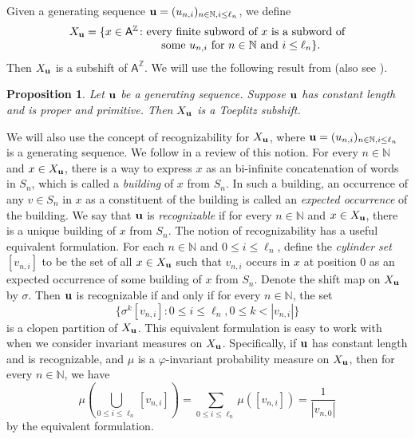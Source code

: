 \documentclass{amsart}
\newtheorem{proposition}[theorem]{Proposition}
\theoremstyle{definition}
\theoremstyle{problem}
\theoremstyle{remark}
\numberwithin{equation}{section}
\begin{document}
Given a generating sequence ${\bf u}=(u_{n,i})_{n\in\mathbb{N}, i\leq \ell_n}$, we define 
$$\begin{array}{rl} X_{\bf u}=\{x\in \mathsf{A}^\mathbb{Z}\colon &\!\!\!\!\!\!\!\! \mbox{ every finite subword of $x$ is a subword of} \\
& \mbox{ some $u_{n,i}$ for $n\in\mathbb{N}$ and $i\leq \ell_n$}\}. 
\end{array}
$$ 
Then $X_{\bf u}$ is a subshift of $\mathsf{A}^\mathbb{Z}$. We will use the following result from \cite[Proposition 2.5]{ADE} (also see \cite[Proposition 3.1]{GLPS}).

\begin{proposition}\label{prop:Toe} Let ${\bf u}$ be a generating sequence. Suppose ${\bf u}$ has constant length and is proper and primitive. Then $X_{\bf u}$ is a Toeplitz subshift.
\end{proposition}

We will also use the concept of recognizability for $X_{\bf u}$, where ${\bf u}=(u_{n,i})_{n\in\mathbb{N}, i\leq \ell_n}$ is a generating sequence. We follow \cite{GL} in a review of this notion. 
For every $n\in\mathbb{N}$ and $x\in X_{\bf u}$, there is a way to express $x$ as an bi-infinite concatenation of words in $S_n$, which is called a {\em building} of $x$ from $S_n$. In such a building, an occurrence of any $v\in S_n$ in $x$ as a constituent of the building is called an {\em expected occurrence} of the building. We say that ${\bf u}$ is {\em recognizable} if for every $n\in \mathbb{N}$ and $x\in X_{\bf u}$, there is a unique building of $x$ from $S_n$. 
The notion of recognizability has a useful equivalent formulation. For each $n\in\mathbb{N}$ and $0\leq i\leq \ell_n$, define the {\em cylinder set} 
$ [v_{n,i}]$ to be the set of all $x\in X_{\bf u}$ such that  $v_{n,i}$ occurs in  $x$  at position $0$ as an expected occurrence of  some building of $x$  from $S_n$.  Denote the shift map on $X_{\bf u}$ by $\sigma$. Then ${\bf u}$ is recognizable if and only if for every $n\in\mathbb{N}$, the set
$$ \{ \sigma^k[v_{n,i}]\colon 0\leq i\leq \ell_n, 0\leq k<|v_{n,i}|\} $$
is a clopen partition of $X_{\bf u}$. This equivalent formulation is easy to work with when we consider invariant measures on $X_{\bf u}$. Specifically, if ${\bf u}$ has constant length and is recognizable, and $\mu$ is a $\varphi$-invariant probability measure on $X_{\bf u}$, then for every $n\in\mathbb{N}$, we have 
$$ \mu\left(\bigcup_{0\leq i\leq \ell_n}[v_{n,i}]\right)=\displaystyle\sum_{0\leq i\leq \ell_n}\mu([v_{n,i}])=\displaystyle\frac{1}{|v_{n,0}|} $$
by the equivalent formulation.
\end{document}
